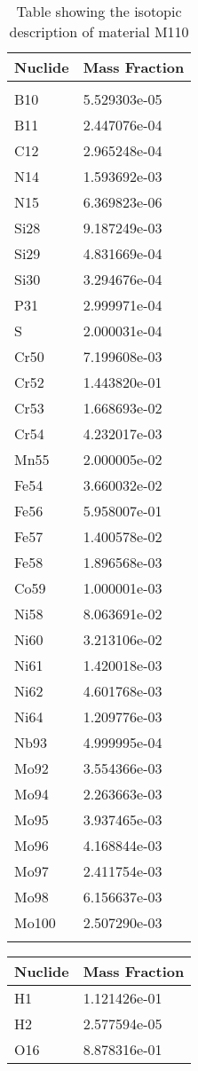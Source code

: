 \begin{centering}
\begin{longtable}[ht!]
{ p{} | p{} }
\hline
Nuclide & Mass Fraction\\
\hline
\\
B10 & 5.529303e-05\\
B11 & 2.447076e-04\\
C12 & 2.965248e-04\\
N14 & 1.593692e-03\\
N15 & 6.369823e-06\\
Si28 & 9.187249e-03\\
Si29 & 4.831669e-04\\
Si30 & 3.294676e-04\\
P31 & 2.999971e-04\\
S & 2.000031e-04\\
Cr50 & 7.199608e-03\\
Cr52 & 1.443820e-01\\
Cr53 & 1.668693e-02\\
Cr54 & 4.232017e-03\\
Mn55 & 2.000005e-02\\
Fe54 & 3.660032e-02\\
Fe56 & 5.958007e-01\\
Fe57 & 1.400578e-02\\
Fe58 & 1.896568e-03\\
Co59 & 1.000001e-03\\
Ni58 & 8.063691e-02\\
Ni60 & 3.213106e-02\\
Ni61 & 1.420018e-03\\
Ni62 & 4.601768e-03\\
Ni64 & 1.209776e-03\\
Nb93 & 4.999995e-04\\
Mo92 & 3.554366e-03\\
Mo94 & 2.263663e-03\\
Mo95 & 3.937465e-03\\
Mo96 & 4.168844e-03\\
Mo97 & 2.411754e-03\\
Mo98 & 6.156637e-03\\
Mo100 & 2.507290e-03\\

\caption{Table showing the isotopic description of material M110}
\label{table:material_M110}
\end{longtable}\clearpage

\begin{longtable}[ht!]
{ p{} | p{} }
\hline
Nuclide & Mass Fraction\\
\hline
H1 & 1.121426e-01\\
H2 & 2.577594e-05\\
O16 & 8.878316e-01\\


\end{longtable}
\end{centering}
